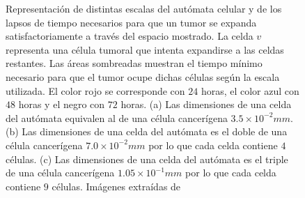 \begin{figure}[!ht]
\begin{center}
\end{center}\vspace*{-0.5cm}
\caption[Representaci\'on de distintas escalas del aut\'omata celular]{Representaci\'on de distintas escalas del aut\'omata celular y de los lapsos de tiempo necesarios para que un tumor se expanda satisfactoriamente a trav\'es del espacio mostrado. La celda $v$ representa una c\'elula tumoral que intenta expandirse a las celdas restantes. Las \'areas sombreadas muestran el tiempo m\'inimo necesario para que el tumor ocupe dichas c\'elulas seg\'un la escala utilizada. El color rojo se corresponde con $24$ horas, el color azul con $48$ horas y el negro con $72$ horas. (a) Las dimensiones de una celda del aut\'omata equivalen al de una c\'elula cancer\'igena $3$.$5 \times 10^{-2}mm$. (b) Las dimensiones de una celda del aut\'omata es el doble de una c\'elula cancer\'igena $7$.$0 \times 10^{-2}mm$ por lo que cada celda contiene $4$ c\'elulas. (c) Las dimensiones de una celda del aut\'omata es el triple de una c\'elula cancer\'igena $1$.$05 \times 10^{-1}mm$ por lo que cada celda contiene $9$ c\'elulas. Im\'agenes extra\'idas de \cite{viabarre2019}}
\label{fig-scales-1}
\end{figure}

